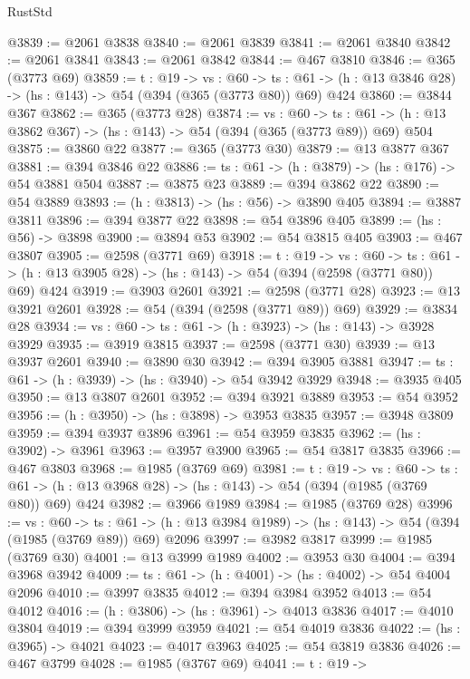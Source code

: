 \begin{lexlean}{RustStd}
\begin{coremodule}
@3839 := @2061 @3838
@3840 := @2061 @3839
@3841 := @2061 @3840
@3842 := @2061 @3841
@3843 := @2061 @3842
@3844 := @467 @3810
@3846 := @365 (@3773 @69)
@3859 := {t : @19} ->
  {vs : @60} ->
  {ts : @61} -> (h : @13 @3846 @28) -> (hs : @143) -> @54 (@394 (@365 (@3773 @80)) @69) @424
@3860 := @3844 @367
@3862 := @365 (@3773 @28)
@3874 := {vs : @60} ->
  {ts : @61} -> (h : @13 @3862 @367) -> (hs : @143) -> @54 (@394 (@365 (@3773 @89)) @69) @504
@3875 := @3860 @22
@3877 := @365 (@3773 @30)
@3879 := @13 @3877 @367
@3881 := @394 @3846 @22
@3886 := {ts : @61} -> (h : @3879) -> (hs : @176) -> @54 @3881 @504
@3887 := @3875 @23
@3889 := @394 @3862 @22
@3890 := @54 @3889
@3893 := (h : @3813) -> (hs : @56) -> @3890 @405
@3894 := @3887 @3811
@3896 := @394 @3877 @22
@3898 := @54 @3896 @405
@3899 := (hs : @56) -> @3898
@3900 := @3894 @53
@3902 := @54 @3815 @405
@3903 := @467 @3807
@3905 := @2598 (@3771 @69)
@3918 := {t : @19} ->
  {vs : @60} ->
  {ts : @61} -> (h : @13 @3905 @28) -> (hs : @143) -> @54 (@394 (@2598 (@3771 @80)) @69) @424
@3919 := @3903 @2601
@3921 := @2598 (@3771 @28)
@3923 := @13 @3921 @2601
@3928 := @54 (@394 (@2598 (@3771 @89)) @69)
@3929 := @3834 @28
@3934 := {vs : @60} -> {ts : @61} -> (h : @3923) -> (hs : @143) -> @3928 @3929
@3935 := @3919 @3815
@3937 := @2598 (@3771 @30)
@3939 := @13 @3937 @2601
@3940 := @3890 @30
@3942 := @394 @3905 @3881
@3947 := {ts : @61} -> (h : @3939) -> (hs : @3940) -> @54 @3942 @3929
@3948 := @3935 @405
@3950 := @13 @3807 @2601
@3952 := @394 @3921 @3889
@3953 := @54 @3952
@3956 := (h : @3950) -> (hs : @3898) -> @3953 @3835
@3957 := @3948 @3809
@3959 := @394 @3937 @3896
@3961 := @54 @3959 @3835
@3962 := (hs : @3902) -> @3961
@3963 := @3957 @3900
@3965 := @54 @3817 @3835
@3966 := @467 @3803
@3968 := @1985 (@3769 @69)
@3981 := {t : @19} ->
  {vs : @60} ->
  {ts : @61} -> (h : @13 @3968 @28) -> (hs : @143) -> @54 (@394 (@1985 (@3769 @80)) @69) @424
@3982 := @3966 @1989
@3984 := @1985 (@3769 @28)
@3996 := {vs : @60} ->
  {ts : @61} -> (h : @13 @3984 @1989) -> (hs : @143) -> @54 (@394 (@1985 (@3769 @89)) @69) @2096
@3997 := @3982 @3817
@3999 := @1985 (@3769 @30)
@4001 := @13 @3999 @1989
@4002 := @3953 @30
@4004 := @394 @3968 @3942
@4009 := {ts : @61} -> (h : @4001) -> (hs : @4002) -> @54 @4004 @2096
@4010 := @3997 @3835
@4012 := @394 @3984 @3952
@4013 := @54 @4012
@4016 := (h : @3806) -> (hs : @3961) -> @4013 @3836
@4017 := @4010 @3804
@4019 := @394 @3999 @3959
@4021 := @54 @4019 @3836
@4022 := (hs : @3965) -> @4021
@4023 := @4017 @3963
@4025 := @54 @3819 @3836
@4026 := @467 @3799
@4028 := @1985 (@3767 @69)
@4041 := {t : @19} ->

\end{coremodule}
\end{lexlean}
